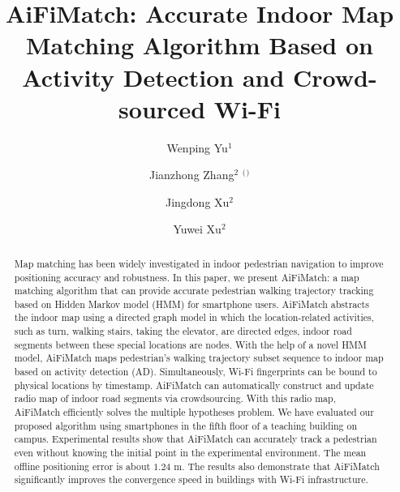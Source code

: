 \documentclass{llncs}
\begin{document}
%
\title{AiFiMatch: Accurate Indoor Map Matching Algorithm Based on Activity Detection and Crowd-sourced Wi-Fi}
%

\author{Wenping Yu$^1$\and Jianzhong Zhang$^2$ $^($\Envelope$^)$\and Jingdong Xu$^2$ \and Yuwei Xu$^2$}
%
%
%


\maketitle              %

\begin{abstract}

Map matching has been widely investigated in indoor pedestrian navigation to improve positioning accuracy and robustness. In this paper, we present AiFiMatch: a map matching algorithm that can provide accurate pedestrian walking trajectory  tracking based on Hidden Markov model (HMM) for smartphone users. AiFiMatch abstracts the indoor map using a directed graph model in which the location-related activities, such as turn, walking stairs, taking the elevator, are directed edges, indoor road segments between these special locations are nodes. With the help of a novel HMM model, AiFiMatch maps pedestrian's walking trajectory subset sequence to indoor map based on activity detection (AD). Simultaneously, Wi-Fi fingerprints can be bound to physical locations by timestamp. AiFiMatch can automatically construct and update radio map of indoor road segments via crowdsourcing. With this radio map, AiFiMatch  efficiently solves the multiple hypotheses problem. We have evaluated our proposed algorithm using smartphones in the fifth floor of a teaching building on campus. Experimental results show that AiFiMatch can accurately track a pedestrian even without knowing the initial point in the experimental environment.  The mean offline positioning error is about $1.24$ m. The results also demonstrate that AiFiMatch significantly improves the convergence speed in buildings with Wi-Fi infrastructure.


\end{abstract}
%
\end{document}
